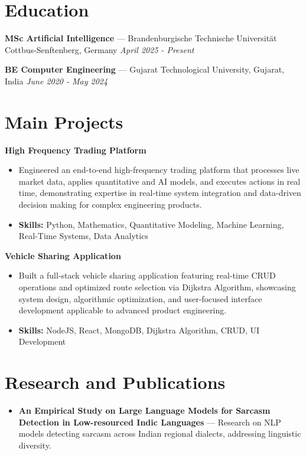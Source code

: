 \documentclass[a4paper,10pt]{article}
\begin{document}
\section*{Education}
\textbf{MSc Artificial Intelligence} — Brandenburgische Technische Universität Cottbus-Senftenberg, Germany \hfill \textit{April 2025 - Present}\par
\vspace{1.5pt}
\textbf{BE Computer Engineering} — Gujarat Technological University, Gujarat, India \hfill \textit{June 2020 - May 2024}\par

\section*{Main Projects}
\textbf{High Frequency Trading Platform}\par
\vspace{1pt}
\begin{itemize}
  \item Engineered an end-to-end high-frequency trading platform that processes live market data, applies quantitative and AI models, and executes actions in real time, demonstrating expertise in real-time system integration and data-driven decision making for complex engineering products.
  \item \textbf{Skills:} Python, Mathematics, Quantitative Modeling, Machine Learning, Real-Time Systems, Data Analytics
\end{itemize}
\vspace{3pt}
\textbf{Vehicle Sharing Application}\par
\vspace{1pt}
\begin{itemize}
  \item Built a full-stack vehicle sharing application featuring real-time CRUD operations and optimized route selection via Dijkstra Algorithm, showcasing system design, algorithmic optimization, and user-focused interface development applicable to advanced product engineering.
  \item \textbf{Skills:} NodeJS, React, MongoDB, Dijkstra Algorithm, CRUD, UI Development
\end{itemize}

\section*{Research and Publications}
\begin{itemize}
\item \textbf{An Empirical Study on Large Language Models for Sarcasm Detection in Low-resourced Indic Languages} — Research on NLP models detecting sarcasm across Indian regional dialects, addressing linguistic diversity.
\end{itemize}
\end{document}
